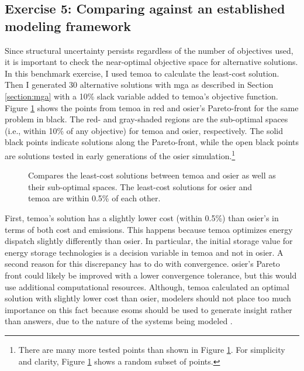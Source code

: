 \subsection{Exercise 5: Comparing against an established modeling framework}
Since structural uncertainty persists regardless of the number of objectives
used, it is important to check the near-optimal objective space for alternative
solutions. In this benchmark exercise, I used \ac{temoa} to calculate the
least-cost solution. Then I generated 30 alternative solutions with \ac{mga} as
described in Section \ref{section:mga} with a 10\% slack variable added to
\ac{temoa}'s objective function. Figure \ref{fig:temoa-benchmark-01} shows the
points from \ac{temoa} in red and \ac{osier}'s Pareto-front for the same problem
in black. The red- and gray-shaded regions are the sub-optimal spaces (i.e.,
within 10\% of any objective) for \ac{temoa} and \ac{osier}, respectively. The
solid black points indicate solutions along the Pareto-front, while the open black
points are solutions tested in early generations of the \ac{osier}
simulation.\footnote{There are many more tested points than shown in Figure
\ref{fig:temoa-benchmark-01}. For simplicity and clarity, Figure
\ref{fig:temoa-benchmark-01} shows a random subset of points.}

\begin{figure}[h]
  \centering
  \resizebox{0.75\columnwidth}{!}{}
  \caption{Compares the least-cost solutions between \acs{temoa}
  and \acs{osier} as well as their sub-optimal spaces. The least-cost solutions
  for \ac{osier} and \ac{temoa} are within 0.5\% of each other.}
  \label{fig:temoa-benchmark-01}
\end{figure}

First, \ac{temoa}'s solution has a slightly lower cost (within 0.5\%) than
\ac{osier}'s in terms of both cost and emissions. This happens because
\ac{temoa} optimizes energy dispatch slightly differently than \ac{osier}. In
particular, the initial storage value for energy storage technologies is a
decision variable in \ac{temoa} and not in \ac{osier}. A second reason for this
discrepancy has to do with convergence. \ac{osier}'s Pareto front could likely
be improved with a lower convergence tolerance, but this would use additional
computational resources. Although, \ac{temoa} calculated an optimal solution
with slightly lower cost than \ac{osier}, modelers should not place too much
importance on this fact because \acp{esom} should be used to generate insight
rather than answers, due to the nature of the systems being modeled
\cite{decarolis_using_2011}.

